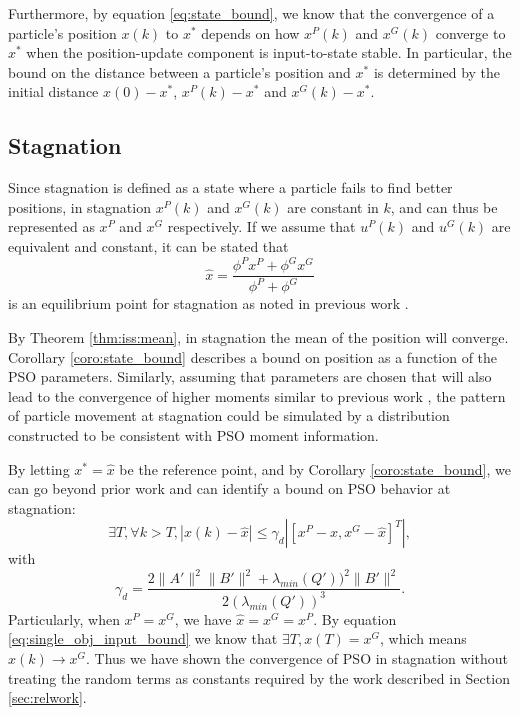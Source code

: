 \documentclass{sig-alternate}
\begin{document}
Furthermore, by equation \eqref{eq:state_bound}, we know that the convergence of a particle's position $ x(k) $ to $ x^{*} $ depends on how $ x^{P}(k) $ and $ x^{G}(k) $ converge to $ x^{*} $ when the position-update component is input-to-state stable.
In particular, the bound on the distance between a particle's position and  $ x^{*} $ is determined by the initial distance $ x(0) -  x^{*} $, $ x^{P}(k) -  x^{*} $ and $ x^{G}(k) -  x^{*} $.

\subsection{Stagnation}

Since stagnation is defined as a state where a particle fails to find better positions, in stagnation $ x^{P}(k) $ and $ x^{G}(k) $ are constant in $ k $, and can thus be represented as $ x^{P} $ and $ x^{G} $ respectively.
If we assume that $ u^{P}(k) $ and $ u^{G}(k) $ are equivalent and constant, it can be stated that
\begin{equation}
\label{eq:single_obj_equilibrium}
\hat{x} = \frac{\phi^{P} x^{P} + \phi^{G} x^{G} }{ \phi^{P} + \phi^{G} } 
\end{equation}
is an equilibrium point for stagnation as noted in previous work \cite{985692}.

By Theorem \ref{thm:iss:mean}, in stagnation the mean of the position will converge.
Corollary \ref{coro:state_bound} describes a bound on position as a function of the PSO parameters.
Similarly, assuming that parameters are chosen that will also lead to the convergence of higher moments similar to previous work \cite{Jiang20078, Poli:2007:EAS:1276958.1276977}, the pattern of particle movement at stagnation could be simulated by a distribution constructed to be consistent with PSO moment information\cite{Poli:2007:EAS:1276958.1276977}.

By letting $ x^{*} = \hat{x} $ be the reference point, and
by Corollary \ref{coro:state_bound}, we can go beyond prior work and can identify a bound on PSO behavior at stagnation:
\begin{equation}
\label{eq:single_obj_input_bound}
\exists T, \forall k > T, 
| x(k) - \hat{x} | \leq  \gamma_{d} | [ x^{P} - \hat{x}, x^{G} - \hat{x} ]^{T} |,
\end{equation}
with 
\begin{equation}
\gamma_{d} = \frac{ 2 \lVert A' \rVert^{2} \lVert B' \rVert^{2} + \lambda_{min}(Q') )^{2} \lVert B' \rVert^{2} }{ 2( \lambda_{min}(Q') )^{3} }.
\end{equation}
Particularly, when $ x^{P} = x^{G} $, we have
$ \hat{x} = x^{G} = x^{P} $.
By equation \eqref{eq:single_obj_input_bound} we know that
$ \exists T , x(T) = x^{G} $, 
which means $ x(k) \rightarrow x^{G} $.
Thus we have shown the convergence of PSO in stagnation without treating the random terms as constants required by the work described in Section \ref{sec:relwork}.
\end{document}
